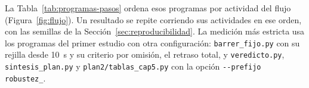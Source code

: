 La Tabla~\ref{tab:programas-pasos} ordena esos programas por actividad
del flujo (Figura~\ref{fig:flujo}). Un resultado se repite corriendo
sus actividades en ese orden, con las semillas de la
Sección~\ref{sec:reproducibilidad}. La medición más estricta usa los
programas del primer estudio con otra configuración:
\texttt{barrer\_fijo.py} con su rejilla desde 10~s y su criterio por
omisión, el retraso total, y \texttt{veredicto.py},
\texttt{sintesis\_plan.py} y \texttt{plan2/\allowbreak tablas\_cap5.py}
con la opción \texttt{-{}-prefijo robustez\_}.

